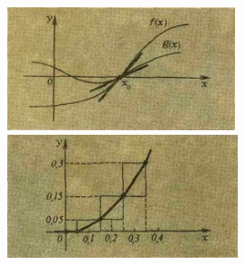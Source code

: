 \pagestyle{fancy}
\fancyfoot{}
\fancyfoot[LO]{\textbf{\LARGE\thepage}}
\setlength{\textfloatsep}{3dd}
\setlength{\belowdisplayskip}{1dd} \setlength{\belowdisplayshortskip}{1dd}
\setlength{\abovedisplayskip}{1dd} \setlength{\abovedisplayshortskip}{1dd}
\setlength{\parskip}{2dd}
\begin{figure}
\centering
\begin{minipage}{0.48\textwidth}
	\raggedleft
	\includegraphics[width =\linewidth, height = 3.6cm]{fig1}
	\caption{.}
	\label{fig:left}
\end{minipage}%
\hspace{0.5cm}%
\begin{minipage}{0.48\textwidth}
	\raggedleft
	\includegraphics[width =\linewidth, height = 3.6cm]{fig2}
	\caption{}
	\label{fig:right}
\end{minipage}
\end{figure}
\setlength{\textfloatsep}{2dd}
